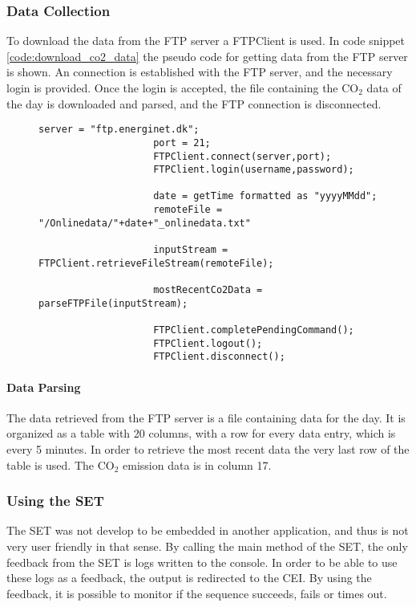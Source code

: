 \documentclass[Main]{subfiles}
\begin{document}
		\subsubsection{Data Collection}
		\label{sub:data_collection}
			To download the data from the FTP server a FTPClient\cite{FTPClient:Online} is used. 
			In code snippet \ref{code:download_co2_data} the pseudo code for getting data from the FTP server is shown. 
			An connection is established with the FTP server, and the necessary login is provided.
			Once the login is accepted, the file containing the CO$_2$ data of the day is downloaded and parsed, and the FTP connection is disconnected.

			\begin{figure}[H]
				\begin{lstlisting}[caption=Download CO2 data, style=Code-C, label=code:download_co2_data]
					server = "ftp.energinet.dk";
	        		port = 21;
					FTPClient.connect(server,port);
					FTPClient.login(username,password);

					date = getTime formatted as "yyyyMMdd";
					remoteFile = "/Onlinedata/"+date+"_onlinedata.txt"

					inputStream = FTPClient.retrieveFileStream(remoteFile);

					mostRecentCo2Data = parseFTPFile(inputStream);

					FTPClient.completePendingCommand();
					FTPClient.logout();
					FTPClient.disconnect();
				\end{lstlisting}
			\end{figure}


			\paragraph{Data Parsing} %
			\label{par:data_parsing}
				The data retrieved from the FTP server is a file containing data for the day. 
				It is organized as a table with 20 columns, with a row for every data entry, which is every 5 minutes.
				In order to retrieve the most recent data the very last row of the table is used.
				The CO$_2$ emission data is in column 17.

		\subsubsection{Using the SET} %
		\label{sub:using_sequence_executor_tool}
			The SET was not develop to be embedded in another application, and thus is not very user friendly in that sense.
			By calling the main method of the SET, the only feedback from the SET is logs written to the console. 
			In order to be able to use these logs as a feedback, the output is redirected to the CEI.
			By using the feedback, it is possible to monitor if the sequence succeeds, fails or times out.
\end{document}
